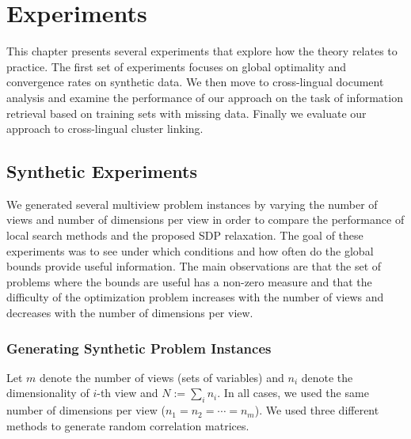 %
\chapter{Experiments}\label{chap:experiments}

This chapter presents several experiments that explore how the theory relates
to practice. The first set of experiments focuses on global optimality
and convergence rates on synthetic data. We then move to
cross-lingual document analysis and examine the performance
of our approach on the task of information retrieval based
on training sets with missing data. Finally we evaluate our
approach to cross-lingual cluster linking.

\section{Synthetic Experiments}\label{chap:experiments:synthetic}
We generated several multiview problem instances by varying the number
of views and number of dimensions per view in order to
compare the performance of local search methods and the proposed
SDP relaxation. The goal of these experiments was to see
under which conditions and how often do the global bounds
provide useful information. The main observations are that the
set of problems where the bounds are useful has a non-zero
measure and that the difficulty of the optimization problem
increases with the number of views and decreases with the
number of dimensions per view.

\subsection{Generating Synthetic Problem Instances}

Let $m$ denote the number of views (sets of variables) and
$n_i$ denote the dimensionality of $i$-th
view and $N := \sum_i n_i$. In all cases, we used the same number
of dimensions per view ($n_1 = n_2 = \cdots = n_m$). We used
three different methods to generate random correlation matrices.

